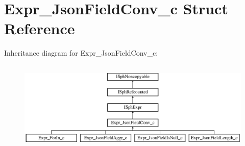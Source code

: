 \hypertarget{structExpr__JsonFieldConv__c}{\section{Expr\-\_\-\-Json\-Field\-Conv\-\_\-c Struct Reference}
\label{structExpr__JsonFieldConv__c}
}
Inheritance diagram for Expr\-\_\-\-Json\-Field\-Conv\-\_\-c\-:\begin{figure}[H]
\begin{center}
\leavevmode
\includegraphics[height=4.375000cm]{structExpr__JsonFieldConv__c}
\end{center}
\end{figure}
